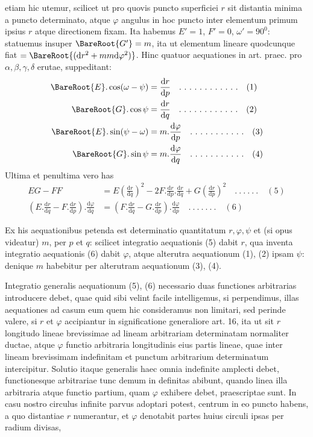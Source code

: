 %
etiam hic utemur, scilicet ut pro quovis puncto superficiei \(r\) sit distantia minima a puncto determinato, atque \(\varphi\) angulus in hoc puncto inter elementum primum ipsius \(r\) atque directionem fixam. Ita habemus \(E'=1\), \(F'=0\), \(\omega'=90^0\): statuemus insuper \(\BareRoot{G'}=m\), ita ut elementum lineare quodcunque fiat \(=\BareRoot{(\mathrm{d}r^2+mm\mathrm{d}\varphi^2)}\). Hinc quatuor aequationes in art. praec. pro \(\alpha,\beta,\gamma,\delta\) erutae, suppeditant:
\[
\begin{aligned}
\BareRoot{E}\mathord{.}\cos(\omega-\psi)&=\frac{\mathrm{d}r}{\mathrm{d}p}\quad .\ .\ .\ .\ .\ .\ .\ .\ .\ .\ .\ .\quad(1)\\
\BareRoot{G}\mathord{.}\cos\psi&=\frac{\mathrm{d}r}{\mathrm{d}q}\quad .\ .\ .\ .\ .\ .\ .\ .\ .\ .\ .\ .\quad(2)\\
\BareRoot{E}\mathord{.}\sin(\psi-\omega)&=m\mathord{.}\frac{\mathrm{d}\varphi}{\mathrm{d}p}\quad .\ .\ .\ .\ .\ .\ .\ .\ .\ .\ .\quad(3)\\
\BareRoot{G}\mathord{.}\sin\psi&=m\mathord{.}\frac{\mathrm{d}\varphi}{\mathrm{d}q}\quad .\ .\ .\ .\ .\ .\ .\ .\ .\ .\ .\quad(4)
\end{aligned}
\]
Ultima et penultima vero has
\[
\begin{aligned}
EG-FF&=E(\frac{\mathrm{d}r}{\mathrm{d}q})^2-2F\mathord{.}\frac{\mathrm{d}r}{\mathrm{d}p}\mathord{.}\frac{\mathrm{d}r}{\mathrm{d}q}+G(\frac{\mathrm{d}r}{\mathrm{d}p})^2\quad .\ .\ .\ .\ .\ .\quad(5)\\
(E\mathord{.}\frac{\mathrm{d}r}{\mathrm{d}q}-F\mathord{.}\frac{\mathrm{d}r}{\mathrm{d}p})\mathord{.}\frac{\mathrm{d}\varphi}{\mathrm{d}q}&=(F\mathord{.}\frac{\mathrm{d}r}{\mathrm{d}q}-G\mathord{.}\frac{\mathrm{d}r}{\mathrm{d}p})\mathord{.}\frac{\mathrm{d}\varphi}{\mathrm{d}p}\quad .\ .\ .\ .\ .\ .\ .\quad(6)
\end{aligned}
\]

Ex his aequationibus petenda est determinatio quantitatum \(r,\varphi,\psi\) et (si opus videatur) \(m\), per \(p\) et \(q\): scilicet integratio aequationis (5) dabit \(r\), qua inventa integratio aequationis (6) dabit \(\varphi\), atque alterutra aequationum (1), (2) ipsam \(\psi\): denique \(m\) habebitur per alterutram aequationum (3), (4).

Integratio generalis aequationum (5), (6) necessario duas functiones arbitrarias introducere debet, quae quid sibi velint facile intelligemus, si perpendimus, illas aequationes ad casum eum quem hic consideramus non limitari, sed perinde valere, si \(r\) et \(\varphi\) accipiantur in significatione generaliore art. 16, ita ut sit \(r\) longitudo lineae brevissimae ad lineam arbitrariam determinatam normaliter ductae, atque \(\varphi\) functio arbitraria longitudinis eius partis lineae, quae inter lineam brevissimam indefinitam et punctum arbitrarium determinatum intercipitur. Solutio itaque generalis haec omnia indefinite amplecti debet, functionesque arbitrariae tunc demum in definitas abibunt, quando linea illa arbitraria atque functio partium, quam \(\varphi\) exhibere debet, praescriptae sunt. In casu nostro circulus infinite parvus adoptari potest, centrum in eo puncto habens, a quo distantiae \(r\) numerantur, et \(\varphi\) denotabit partes huius circuli ipsas per radium divisas,
